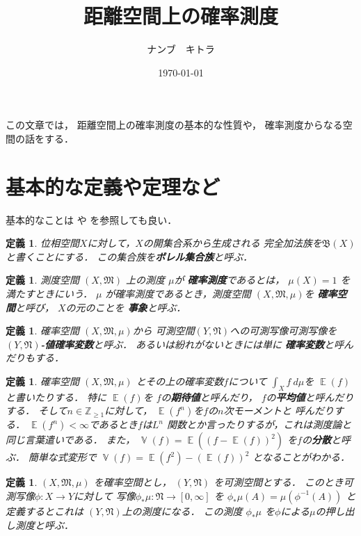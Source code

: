 \documentclass[leqno, a4paper, 12pt]{jsarticle}
\title{距離空間上の確率測度}
\author{ナンブ　キトラ}
\date{\today}
\newtheorem{df}[thm]{定義}
\newcommand{\zz}{\mathbb{Z}}
\DeclareMathOperator{\mean}{\mathbb{E}}
\DeclareMathOperator{\varian}{\mathbb{V}}
\begin{document}
\maketitle

この文章では，
距離空間上の確率測度の基本的な性質や，
確率測度からなる空間の話をする．
\section{基本的な定義や定理など}
基本的なことは
\cite{hatena0}や\cite{hatena1}
を参照しても良い．

\begin{df}
位相空間$X$に対して，$X$の開集合系から生成される
完全加法族を$\mathfrak{B}(X)$と書くことにする．
この集合族を\textbf{ボレル集合族}と呼ぶ．
\end{df}

\begin{df}
測度空間
$(X, \mathfrak{M})$
上の測度
$\mu$が
\textbf{確率測度}であるとは，
$\mu(X)=1$
を満たすときにいう．
$\mu$
が確率測度であるとき，測度空間
$(X, \mathfrak{M}, \mu)$を
\textbf{確率空間}と呼び，
$X$の元のことを
\textbf{事象}と呼ぶ．
\end{df}

\begin{df}
確率空間
$(X, \mathfrak{M}, \mu)$から
可測空間$(Y, \mathfrak{N})$への可測写像可測写像を
\textbf{$(Y, \mathfrak{N})$-値確率変数}と呼ぶ．
あるいは紛れがないときには単に
\textbf{確率変数}と呼んだりもする．
\end{df}

\begin{df}
確率空間
$(X, \mathfrak{M}, \mu)$
とその上の確率変数$f$について
$\int_{X}f\ d\mu$を
$\mean(f)$と書いたりする．
特に
$\mean(f)$を
$f$の\textbf{期待値}と呼んだり，
$f$の\textbf{平均値}と呼んだりする．
そして$n\in \zz_{\ge 1}$に対して，
$\mean(f^{n})$を$f$の$n$次モーメントと
呼んだりする．
$\mean(f^{n})<\infty$であるとき$f$は$L^{n}$
関数とか言ったりするが，これは測度論と同じ言葉遣いである．
また，
$\varian(f)=\mean((f-\mean(f))^{2})$
を$f$の\textbf{分散}と呼ぶ．
簡単な式変形で
$\varian(f)=\mean(f^{2})-(\mean(f))^{2}$
となることがわかる．
\end{df}


\begin{df}
$(X, \mathfrak{M}, \mu)$
を確率空間とし，
$(Y, \mathfrak{N})$
を可測空間とする．
このとき可測写像$\phi:X\to Y$に対して
写像$\phi_{*}\mu: \mathfrak{N}\to [0, \infty]$
を
$\phi_{*}\mu(A)=\mu(\phi^{-1}(A))$
と定義するとこれは
$(Y, \mathfrak{N})$上の測度になる．
この測度
$\phi_{*}\mu$
を$\phi$による$\mu$の押し出し測度と呼ぶ．
\end{df}
\end{document}
